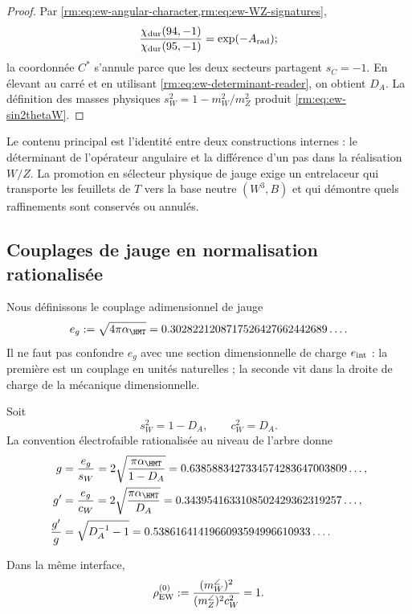 \begin{proof}
Par \cref{rm:eq:ew-angular-character,rm:eq:ew-WZ-signatures},
\[
\frac{\chi_{\rm dur}(94,-1)}{\chi_{\rm dur}(95,-1)}
=\exp(-A_{\rm rad});
\]
la coordonnée \(C^*\) s'annule parce que les deux secteurs partagent
\(s_C=-1\). En élevant au carré et en utilisant
\cref{rm:eq:ew-determinant-reader}, on obtient \(D_A\). La définition
des masses physiques \(s_W^2=1-m_W^2/m_Z^2\) produit
\cref{rm:eq:ew-sin2thetaW}.
\end{proof}

Le contenu principal est l'identité entre deux constructions
internes : le déterminant de l'opérateur angulaire et la différence d'un pas
dans la réalisation \(W/Z\). La promotion en sélecteur physique de jauge exige
un entrelaceur qui transporte les feuillets de \(T\) vers la base neutre
\((W^3,B)\) et qui démontre quels raffinements sont conservés ou annulés.

\subsection{Couplages de jauge en normalisation rationalisée}

Nous définissons le couplage adimensionnel de jauge
\begin{equation}
\label{rm:eq:ew-egauge}
e_g:=\sqrt{4\pi\alpha_{\HMT}}
=0.3028221208717526427662442689\ldots .
\end{equation}
Il ne faut pas confondre \(e_g\) avec une section dimensionnelle de charge
\(e_{\rm int}\) : la première est un couplage en unités naturelles ; la
seconde vit dans la droite de charge de la mécanique dimensionnelle.

Soit
\begin{equation}
\label{rm:eq:ew-sw-cw}
s_W^2=1-D_A,
\qquad
c_W^2=D_A.
\end{equation}
La convention électrofaible rationalisée au niveau de l'arbre donne
\begin{align}
g&=\frac{e_g}{s_W}
=2\sqrt{\frac{\pi\alpha_{\HMT}}{1-D_A}}
=0.6385883427334574283647003809\ldots,
\label{rm:eq:ew-g}\\
g'&=\frac{e_g}{c_W}
=2\sqrt{\frac{\pi\alpha_{\HMT}}{D_A}}
=0.3439541633108502429362319257\ldots,
\label{rm:eq:ew-gprime}\\
\frac{g'}{g}
&=\sqrt{D_A^{-1}-1}
=0.5386164141966093594996610933\ldots .
\label{rm:eq:ew-gprime-over-g}
\end{align}

\begin{proposition}
\label{rm:prop:ew-rho}
Dans la même interface,
\begin{equation}
\label{rm:eq:ew-rho}
\rho_{\rm EW}^{(0)}
:=\frac{(m_W^{\angle})^2}
{(m_Z^{\angle})^2c_W^2}=1.
\end{equation}
\end{proposition}

